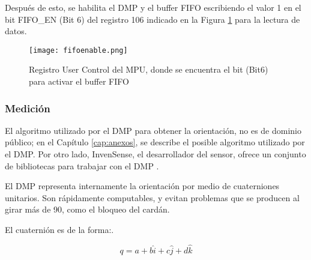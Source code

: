 Después de esto, se habilita el DMP y el buffer FIFO escribiendo el valor 1 en el bit FIFO\_EN (Bit 6) del registro 106 indicado en la Figura \ref{fig:fifoen} para la lectura de datos.

\begin{figure}[htb]
	\centering
	\texttt{[image: fifoenable.png]}
	\caption{Registro User Control del MPU, donde se encuentra el bit (Bit6) para activar el buffer FIFO}
	\label{fig:fifoen}
\end{figure}

\subsubsection{Medición}

El algoritmo utilizado por el DMP para obtener la orientación, no es de dominio público; en el Capítulo \ref{cap:anexos}, se describe el posible algoritmo utilizado por el DMP. Por otro lado, InvenSense, el desarrollador del sensor, ofrece un conjunto de bibliotecas para trabajar con el DMP \cite{userguideMotionDriver}.



El DMP representa internamente la orientación por medio de cuaterniones unitarios. Son rápidamente computables, y evitan problemas que se producen al girar más de 90\degree, como el bloqueo del cardán.

El cuaternión es de la forma:.

\begin{equation}
	q = a + b\hat{i} + c\hat{j} + d\hat{k}
	\label{eq:eqcuaternion}
\end{equation}

